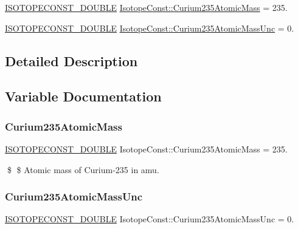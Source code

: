\begin{DoxyCompactItemize}
\item 
\mbox{\hyperlink{group___isotope_const-_macros_ga8f45a7272ce02c0b4c65c44636ed719a}{I\+S\+O\+T\+O\+P\+E\+C\+O\+N\+S\+T\+\_\+\+D\+O\+U\+B\+LE}} \mbox{\hyperlink{group___isotope_const-_curium-_cm235_ga85b25fa360df7c7f669cd9978e47c64f}{Isotope\+Const\+::\+Curium235\+Atomic\+Mass}} = 235.
\item 
\mbox{\hyperlink{group___isotope_const-_macros_ga8f45a7272ce02c0b4c65c44636ed719a}{I\+S\+O\+T\+O\+P\+E\+C\+O\+N\+S\+T\+\_\+\+D\+O\+U\+B\+LE}} \mbox{\hyperlink{group___isotope_const-_curium-_cm235_gac5f1b976e6ad21eadd51fa3f951a4c51}{Isotope\+Const\+::\+Curium235\+Atomic\+Mass\+Unc}} = 0.
\end{DoxyCompactItemize}


\subsection{Detailed Description}


\subsection{Variable Documentation}
\mbox{\label{group___isotope_const-_curium-_cm235_ga85b25fa360df7c7f669cd9978e47c64f}} 
\subsubsection{\texorpdfstring{Curium235\+Atomic\+Mass}{Curium235AtomicMass}}
{\footnotesize\ttfamily \mbox{\hyperlink{group___isotope_const-_macros_ga8f45a7272ce02c0b4c65c44636ed719a}{I\+S\+O\+T\+O\+P\+E\+C\+O\+N\+S\+T\+\_\+\+D\+O\+U\+B\+LE}} Isotope\+Const\+::\+Curium235\+Atomic\+Mass = 235.}

\$ \$ Atomic mass of Curium-\/235 in amu. \mbox{\label{group___isotope_const-_curium-_cm235_gac5f1b976e6ad21eadd51fa3f951a4c51}} 
\subsubsection{\texorpdfstring{Curium235\+Atomic\+Mass\+Unc}{Curium235AtomicMassUnc}}
{\footnotesize\ttfamily \mbox{\hyperlink{group___isotope_const-_macros_ga8f45a7272ce02c0b4c65c44636ed719a}{I\+S\+O\+T\+O\+P\+E\+C\+O\+N\+S\+T\+\_\+\+D\+O\+U\+B\+LE}} Isotope\+Const\+::\+Curium235\+Atomic\+Mass\+Unc = 0.}

